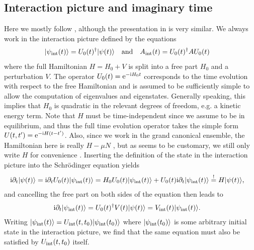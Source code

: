 \subsection{Interaction picture and imaginary time}\label{sec:gf:interaction_imaginary_time}
Here we mostly follow \cite{QMB_Bruus_2004}, although the presentation in \cites[]{QMB_Fabrizio_2022}[]{QMB_Nayak_2004} is very similar.
We always work in the interaction picture defined by the equations \cite[]{QMB_Bruus_2004}
\begin{align}
\vert\psi_{\text{int}}(t)\rangle &= U_0(t)^\dagger \vert\psi(t)\rangle \quad \text{and} \quad A_{\text{int}}(t) = U_0(t)^\dagger A  U_0(t)
\end{align}
where the full Hamiltonian $H=H_0+V$ is split into a free part $H_0$ and a perturbation $V$.
The operator $U_0(t) = \text{e}^{-\text{i} H_0 t}$ corresponds to the time evolution with respect to the free Hamiltonian and is assumed to be sufficiently simple to allow the computation of eigenvalues and eigenstates.
Generally speaking, this implies that $H_0$ is quadratic in the relevant degrees of freedom, e.g. a kinetic energy term.
Note that $H$ must be time-independent since we assume to be in equilibrium, and thus the full time evolution operator takes the simple form $U(t,t') = \text{e}^{-\text{i} H(t-t')}$.
Also, since we work in the grand canonical ensemble, the Hamiltonian here is really $H - \mu N$ \cite{QFT_FiniteT_Kapusta_2023,QMB_Coleman_2015,GF_SelfEnergyFunctionals_Eder_2021}, but as seems to be customary, we still only write $H$ for convenience \cite[]{QMB_Bruus_2004}. %
Inserting the definition of the state in the interaction picture into the Schrödinger equation yields
\begin{align*}
\text{i}\partial_t \vert\psi(t)\rangle &= \text{i} \partial_t U_0(t) \vert\psi_{\text{int}}(t)\rangle = H_0 U_0(t) \vert\psi_{\text{int}}(t)\rangle + U_0(t) \text{i}\partial_t \vert\psi_{\text{int}}(t)\rangle \overset{!}{=} H \vert\psi(t)\rangle,
\end{align*}
and cancelling the free part on both sides of the equation then leads to
\begin{align}
\text{i}\partial_t \vert\psi_{\text{int}}(t)\rangle &= U_0(t)^\dagger V(t) \vert\psi(t)\rangle = V_{\text{int}}(t) \vert\psi_{\text{int}}(t)\rangle. \label{eqn:gf:interaction_picture_schrodinger_vint}
\end{align}
Writing $\vert\psi_{\text{int}}(t)\rangle = U_{\text{int}}(t,t_0) \vert\psi_{\text{int}}(t_0)\rangle$ where $\vert\psi_{\text{int}}(t_0)\rangle$ is some arbitrary initial state in the interaction picture, we find that the same equation must also be satisfied by $U_{\text{int}}(t,t_0)$ itself.
